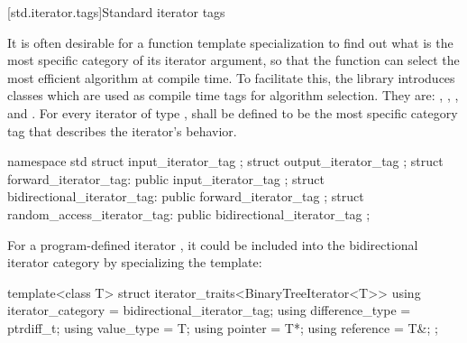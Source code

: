 [std.iterator.tags]{Standard iterator tags}

\pnum
{}%
%
%
%
%
It is often desirable for a
function template specialization
to find out what is the most specific category of its iterator
argument, so that the function can select the most efficient algorithm at compile time.
To facilitate this, the
library introduces
classes which are used as compile time tags for algorithm selection.
They are:
,
,
,
and
.
For every iterator of type
,
shall be defined to be the most specific category tag that describes the
iterator's behavior.

\begin{codeblock}
namespace std {
  struct input_iterator_tag { };
  struct output_iterator_tag { };
  struct forward_iterator_tag: public input_iterator_tag { };
  struct bidirectional_iterator_tag: public forward_iterator_tag { };
  struct random_access_iterator_tag: public bidirectional_iterator_tag { };
}
\end{codeblock}

\pnum
{}%
%
%
%
%
%
\begin{example}
For a program-defined iterator
,
it could be included
into the bidirectional iterator category by specializing the
template:

\begin{codeblock}
template<class T> struct iterator_traits<BinaryTreeIterator<T>> {
  using iterator_category = bidirectional_iterator_tag;
  using difference_type   = ptrdiff_t;
  using value_type        = T;
  using pointer           = T*;
  using reference         = T&;
};
\end{codeblock}
\end{example}

